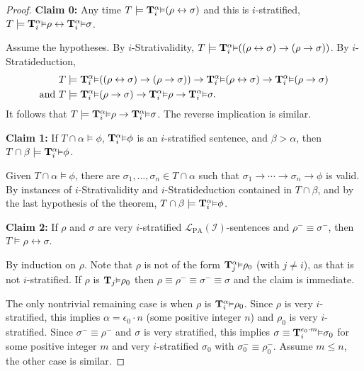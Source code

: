 \documentclass[reqno]{article}
\theoremstyle{definition}
\def\L{\mathscr{L}}
\def\T{\mathbf{T}}
\def\LPA{\L_{\mathrm{PA}}}
\def\indset{\mathcal I}
\renewcommand{\Pr}[1]{\T_{#1}\mbox{\small${\vDash}$}}
\newcommand{\Prr}[2]{\T^{#1}_{#2}\mbox{\small${\vDash}$}}
\newcommand{\claim}[1]{\textbf{Claim #1:}}
\begin{document}
\begin{proof}
\item
\claim0
Any time $T\models \Prr\alpha i(\rho\leftrightarrow\sigma)$
and this is $i$-stratified, $T\models \Prr\alpha i\rho
\leftrightarrow \Prr\alpha i\sigma$.

\item
Assume the hypotheses.  By $i$-Strativalidity,
$T\models \Prr\alpha i((\rho\leftrightarrow\sigma)\rightarrow
(\rho\rightarrow\sigma))$.
By $i$-Stratideduction,
\begin{align*}
&T\models \Prr\alpha i((\rho\leftrightarrow\sigma)
\rightarrow(\rho\rightarrow\sigma))\rightarrow
\Prr\alpha i(\rho\leftrightarrow\sigma)\rightarrow
\Prr\alpha i(\rho\rightarrow\sigma)\\
\mbox{and }
&T\models \Prr\alpha i(\rho\rightarrow\sigma)
\rightarrow\Prr\alpha i\rho\rightarrow\Prr\alpha i\sigma.
\end{align*}
It follows that $T\models \Prr\alpha i\rho\rightarrow\Prr\alpha i\sigma$.
The reverse implication is similar.


\item
\claim1
If $T\cap\alpha\models \phi$, $\Prr\alpha i\phi$ is an $i$-stratified sentence,
and $\beta>\alpha$,
then $T\cap\beta\models\Prr\alpha i\phi$.

\item
Given $T\cap\alpha\models\phi$, there are 
$\sigma_1,\ldots,\sigma_n\in T\cap\alpha$ such that
$\sigma_1\rightarrow\cdots\rightarrow\sigma_n\rightarrow\phi$
is valid.
By instances of $i$-Strativalidity and $i$-Stratideduction
contained in $T\cap\beta$,
and by the last hypothesis of the theorem,
$T\cap\beta\models \Prr\alpha i\phi$.

\item
\claim2
If $\rho$ and $\sigma$ are very $i$-stratified $\LPA(\indset)$-sentences 
and $\rho^-\equiv\sigma^-$, then $T\models\rho\leftrightarrow\sigma$.

\item
By induction on $\rho$.  Note that $\rho$ is not of the form 
$\Prr\alpha j\rho_0$ (with $j\not=i$), as that is not $i$-stratified.
If $\rho$ is $\Pr j\rho_0$ then $\rho\equiv\rho^-\equiv\sigma^-\equiv\sigma$ and
the claim is immediate.

The only nontrivial remaining case is when $\rho$ is $\Prr\alpha i\rho_0$.
Since $\rho$ is very $i$-stratified, this implies $\alpha=\epsilon_0\cdot 
n$ (some positive integer $n$) and $\rho_0$
is very $i$-stratified.
Since $\sigma^-\equiv\rho^-$
and $\sigma$ is very stratified,
this implies $\sigma\equiv \Prr{\epsilon_0\cdot m}i\sigma_0$
for some positive integer $m$ and very $i$-stratified $\sigma_0$
with $\sigma^-_0\equiv\rho^-_0$.
Assume $m\leq n$, the other case is similar.


\end{proof}
\end{document}
